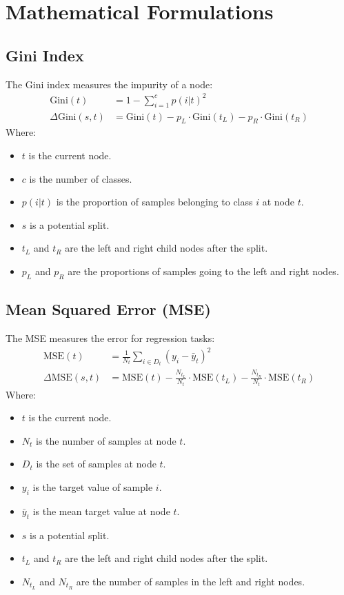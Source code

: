 \documentclass{article}
\begin{document}
\section*{Mathematical Formulations}
\subsection*{Gini Index}
The Gini index measures the impurity of a node:
\begin{align*}
\text{Gini}(t) &= 1 - \sum_{i=1}^{c} p(i|t)^2 \\
\Delta\text{Gini}(s,t) &= \text{Gini}(t) - p_L \cdot \text{Gini}(t_L) - p_R \cdot \text{Gini}(t_R)
\end{align*}
Where:
\begin{itemize}
    \item $t$ is the current node.
    \item $c$ is the number of classes.
    \item $p(i|t)$ is the proportion of samples belonging to class $i$ at node $t$.
    \item $s$ is a potential split.
    \item $t_L$ and $t_R$ are the left and right child nodes after the split.
    \item $p_L$ and $p_R$ are the proportions of samples going to the left and right nodes.
\end{itemize}

\subsection*{Mean Squared Error (MSE)}
The MSE measures the error for regression tasks:
\begin{align*}
\text{MSE}(t) &= \frac{1}{N_t} \sum_{i \in D_t} (y_i - \bar{y}_t)^2 \\
\Delta\text{MSE}(s,t) &= \text{MSE}(t) - \frac{N_{t_L}}{N_t} \cdot \text{MSE}(t_L) - \frac{N_{t_R}}{N_t} \cdot \text{MSE}(t_R)
\end{align*}
Where:
\begin{itemize}
    \item $t$ is the current node.
    \item $N_t$ is the number of samples at node $t$.
    \item $D_t$ is the set of samples at node $t$.
    \item $y_i$ is the target value of sample $i$.
    \item $\bar{y}_t$ is the mean target value at node $t$.
    \item $s$ is a potential split.
    \item $t_L$ and $t_R$ are the left and right child nodes after the split.
    \item $N_{t_L}$ and $N_{t_R}$ are the number of samples in the left and right nodes.
\end{itemize}
\end{document}

